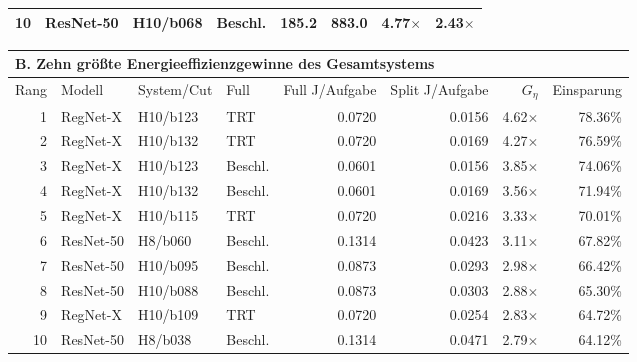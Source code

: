 \begin{table}[t]
\begin{tabular*}{\textwidth}{@{\extracolsep{\fill}}rlllrrrr@{}}
10 & ResNet-50 & H10/b068 & Beschl. & 185.2 & 883.0 & 4.77$\times$ & 2.43$\times$\\
\bottomrule
\end{tabular*}
\par\vspace{0.6em}
\begin{tabular*}{\textwidth}{@{\extracolsep{\fill}}rlllrrrr@{}}
\toprule
\multicolumn{8}{l}{\textbf{B. Zehn größte Energieeffizienzgewinne des Gesamtsystems}}\\
\midrule
Rang & Modell & System/Cut & Full & Full J/Aufgabe & Split J/Aufgabe & $G_\eta$ & Einsparung\\
\midrule
1 & RegNet-X & H10/b123 & TRT & 0.0720 & 0.0156 & 4.62$\times$ & 78.36\%\\
2 & RegNet-X & H10/b132 & TRT & 0.0720 & 0.0169 & 4.27$\times$ & 76.59\%\\
3 & RegNet-X & H10/b123 & Beschl. & 0.0601 & 0.0156 & 3.85$\times$ & 74.06\%\\
4 & RegNet-X & H10/b132 & Beschl. & 0.0601 & 0.0169 & 3.56$\times$ & 71.94\%\\
5 & RegNet-X & H10/b115 & TRT & 0.0720 & 0.0216 & 3.33$\times$ & 70.01\%\\
6 & ResNet-50 & H8/b060 & Beschl. & 0.1314 & 0.0423 & 3.11$\times$ & 67.82\%\\
7 & ResNet-50 & H10/b095 & Beschl. & 0.0873 & 0.0293 & 2.98$\times$ & 66.42\%\\
8 & ResNet-50 & H10/b088 & Beschl. & 0.0873 & 0.0303 & 2.88$\times$ & 65.30\%\\
9 & RegNet-X & H10/b109 & TRT & 0.0720 & 0.0254 & 2.83$\times$ & 64.72\%\\
10 & ResNet-50 & H8/b038 & Beschl. & 0.1314 & 0.0471 & 2.79$\times$ & 64.12\%\\
\bottomrule
\end{tabular*}
\endgroup
\end{table}
